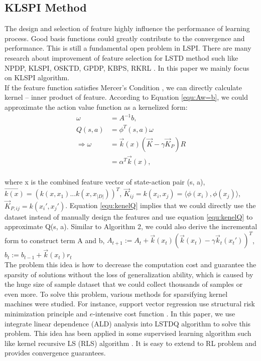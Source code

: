 \subsection{KLSPI Method}
The design and selection of feature highly influence the performance of learning process. Good basis functions could greatly contribute to the convergence and performance. This is still a fundamental open problem in  LSPI. There are many research about improvement of feature selection for LSTD method such like NPDP, KLSPI, OSKTD, GPDP, KBPS, RKRL \cite{chen2013online}\cite{kroemer2011non}. In this paper we mainly focus on KLSPI algorithm.\\
If the feature function satisfies Mercer's Condition \cite{vapnik1999overview}, we can directly calculate kernel -- inner product of feature. According to Equation \eqref{equ:Aw=b}, we could approximate the action value function as a kernelized form:
\begin{align}
 \omega &= A^{-1} b,\\
   Q(s, a) &= \phi^T (s, a) \omega \\ 
   \Rightarrow \omega &= \vec{k} (x) ( \vec K - \gamma \vec K_P) R \\ 
   &= \alpha ^T \vec{k} (x) \label{equ:kenelQ},
\end{align}
\\
where x is the combined feature vector of state-action pair (s, a),  $\vec{k(x)} =  ( k(x, x_1) ... k(x, x_{\vert D \vert}) )^T$, $\vec{K}_{ij} = k(x_i, x_j)  = \langle \phi(x_i),  \phi(x_j) \rangle$, $\vec{K}_{P, ij} = k(x_i', x_j')  $. Equation \eqref{equ:kenelQ} implies that we could directly use the dataset instead of manually design the features and use equation \eqref{equ:kenelQ} to approximate Q(s, a). Similar to Algorithm 2, we could also derive the incremental form to construct term A and b, $A_{t+1} := A_t + \vec k (x_t)( \vec k(x_t) - \gamma \vec k_t(x_t'))^T$,  $b_t := b_{t-1} + \vec k(x_t) r_t$ \\
The problem this idea is how to decrease the computation cost and guarantee the sparsity of solutions without the loss of generalization ability, which is caused by the huge size of sample dataset that we could collect thousands of samples or even more. To solve this problem, various methods for sparsifying kernel machines were studied. For instance, support vector regression use structural risk minimization principle and $e$-intensive cost function \cite{cristianini2000introduction}. In this paper, we use integrate linear dependence (ALD) analysis into LSTDQ algorithm to solve this problem. This idea has been applied in some supervised learning algorithm such like kernel recursive LS (RLS) algorithm \cite{engel2004kernel}. It is easy to extend to RL problem and provides convergence guarantees. \\
